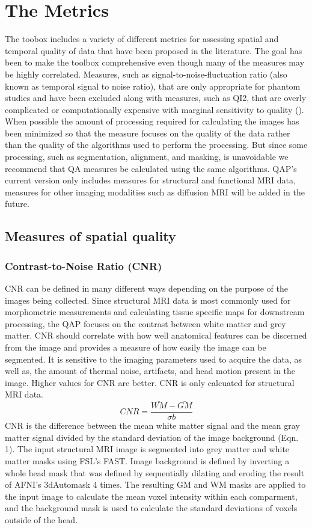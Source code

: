 \section{The Metrics}
\label{sec:2}
The toobox includes a variety of different metrics for assessing spatial and temporal quality of data that have been proposed in the literature. The goal has been to make the toolbox comprehensive even though many of the measures may be highly correlated. Measures, such as signal-to-noise-fluctuation ratio (also known as temporal signal to noise ratio), that are only appropriate for phantom studies and have been excluded along with measures, such as QI2, that are overly complicated or computationally expensive with marginal sensitivity to quality (). When possible the amount of processing required for calculating the images has been minimized so that the measure focuses on the quality of the data rather than the quality of the algorithms used to perform the processing. But since some processing, such as segmentation, alignment, and masking, is unavoidable we recommend that QA measures be calculated using the same algorithms. QAP’s current version only includes measures for structural and functional MRI data, measures for other imaging modalities such as diffusion MRI will be added in the future.
\subsection{Measures of spatial quality}
\label{sec:3}
\subsubsection{Contrast-to-Noise Ratio (CNR)}
\label{sec:4}
CNR can be defined in many different ways depending on the purpose of the images being collected. Since structural MRI data is most commonly used for morphometric measurements and calculating tissue specific maps for downstream processing, the QAP focuses on the contrast between white matter and grey matter. CNR should correlate with how well anatomical features can be discerned from the image and provides a measure of how easily the image can be segmented. It is sensitive to the imaging parameters used to acquire the data, as well as, the amount of thermal noise, artifacts, and head motion present in the image. Higher values for CNR are better. CNR is only calcuated for structural MRI data.
\begin{equation}
CNR = \frac{\bar{WM} - \bar{GM}} {\sigma b}
\end{equation}
CNR is the difference between the mean white matter signal and the mean gray matter signal divided by the standard deviation of the image background (Eqn. 1). The input structural MRI image is segmented into grey matter and white matter masks using FSL’s FAST. Image background is defined by inverting a whole head mask that was defined by sequentially dilating and eroding the result of AFNI’s 3dAutomask 4 times. The resulting GM and WM masks are applied to the input image to calculate the mean voxel intensity within each comparment, and the background mask is used to calculate the standard deviations of voxels outside of the head. 
